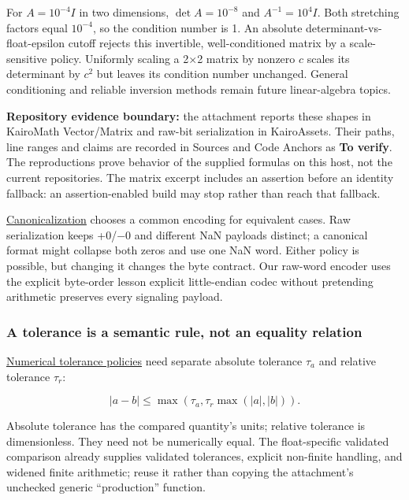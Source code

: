 For \(A=10^{-4}I\) in two dimensions, \(\det A=10^{-8}\) and \(A^{-1}=10^4I\). Both stretching factors equal \(10^{-4}\), so the condition number is 1. An absolute determinant-vs-float-epsilon cutoff rejects this invertible, well-conditioned matrix by a scale-sensitive policy. Uniformly scaling a 2×2 matrix by nonzero \(c\) scales its determinant by \(c^2\) but leaves its condition number unchanged. General conditioning and reliable inversion methods remain future linear-algebra topics.

\textbf{Repository evidence boundary:} the attachment reports these shapes in KairoMath Vector/Matrix and raw-bit serialization in KairoAssets. Their paths, line ranges and claims are recorded in Sources and Code Anchors as \textbf{To verify}. The reproductions prove behavior of the supplied formulas on this host, not the current repositories. The matrix excerpt includes an assertion before an identity fallback: an assertion-enabled build may stop rather than reach that fallback.

\hyperref[appendix-e90053a4b201]{Canonicalization} chooses a common encoding for equivalent cases. Raw serialization keeps +0/−0 and different NaN payloads distinct; a canonical format might collapse both zeros and use one NaN word. Either policy is possible, but changing it changes the byte contract. Our raw-word encoder uses the explicit byte-order lesson explicit little-endian codec without pretending arithmetic preserves every signaling payload.

\subsubsection{A tolerance is a semantic rule, not an equality relation}\label{01-foundations-i-ch001-a-tolerance-is-a-semantic-rule-not-an-equality-relation}

\hypertarget{01-foundations-i-ch001-a-tolerance-is-a-semantic-rule-not-an-equality-relation}{}

\hyperref[appendix-0ec599f8ba27]{Numerical tolerance policies} need separate absolute tolerance \(\tau_a\) and relative tolerance \(\tau_r\):

\[
|a-b|\le\max\!\left(\tau_a,\tau_r\max(|a|,|b|)\right).
\]

Absolute tolerance has the compared quantity's units; relative tolerance is dimensionless. They need not be numerically equal. The float-specific validated comparison already supplies validated tolerances, explicit non-finite handling, and widened finite arithmetic; reuse it rather than copying the attachment's unchecked generic ``production'' function.

